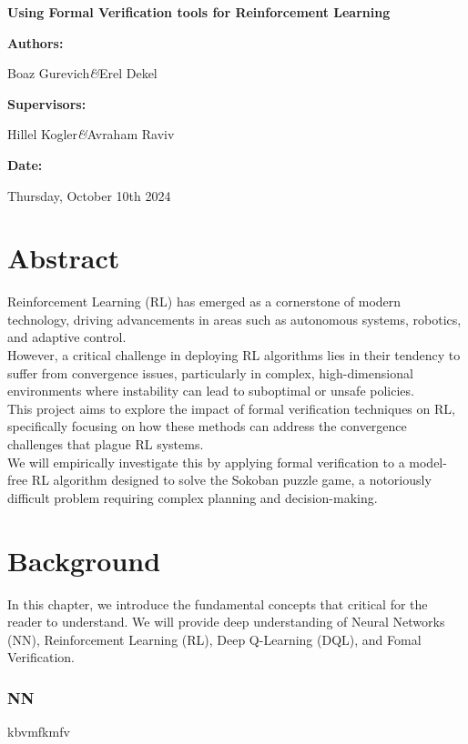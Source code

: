 \documentclass[12pt,a4paper]{report}
\newcommand{\projectname}{Using Formal Verification tools for Reinforcement Learning}
\newcommand{\firstauthor}{Boaz Gurevich}
\newcommand{\secondauthor}{Erel Dekel}
\newcommand{\firstsupervisor}{Hillel Kogler}
\newcommand{\secondsupervisor}{Avraham Raviv}
\newcommand{\submissiondate}{Thursday, October 10th 2024}
\renewcommand{\maketitle}{
    \begin{titlepage}
        \centering
        \vspace*{2cm}
        
        {\huge\bfseries\projectname\par}
        \vspace{1.5cm}
        
        {\large\textbf{Authors:}\par}
        \vspace{0.5cm}
        {\large\firstauthor\hspace{0.3cm}\textit{\&}\hspace{0.3cm}\secondauthor\par}
        
        \vspace{2cm}
        
        {\large\textbf{Supervisors:}\par}
        \vspace{0.5cm}
        {\large\firstsupervisor\hspace{0.3cm}\textit{\&}\hspace{0.3cm}\secondsupervisor\par}
        
        \vspace{2cm}

        {\large\textbf{Date:}\par}
        \vspace{0.5cm}
        {\large\submissiondate\par}
    \end{titlepage}
}
\begin{document}
\hypersetup{
    colorlinks=true,
    linkcolor=blue,
    urlcolor=blue,
    linktoc=all
}

\maketitle

\chapter*{Abstract}
Reinforcement Learning (RL) has emerged as a cornerstone of modern technology, driving advancements in areas such as autonomous systems, robotics, and adaptive control.\\
However, a critical challenge in deploying RL algorithms lies in their tendency to suffer from convergence issues, particularly in complex, high-dimensional environments where instability can lead to suboptimal or unsafe policies.\\
This project aims to explore the impact of formal verification techniques on RL, specifically focusing on how these methods can address the convergence challenges that plague RL systems.\\
We will empirically investigate this by applying formal verification to a model-free RL algorithm designed to solve the Sokoban puzzle game, a notoriously difficult problem requiring complex planning and decision-making.\\

\tableofcontents

\chapter{Background}
In this chapter, we introduce the fundamental concepts that critical for the reader to understand.
We will provide deep understanding of Neural Networks (NN), Reinforcement Learning (RL), Deep Q-Learning (DQL), and Fomal Verification.
\subsection{NN}
kbvmfkmfv
\end{document}
